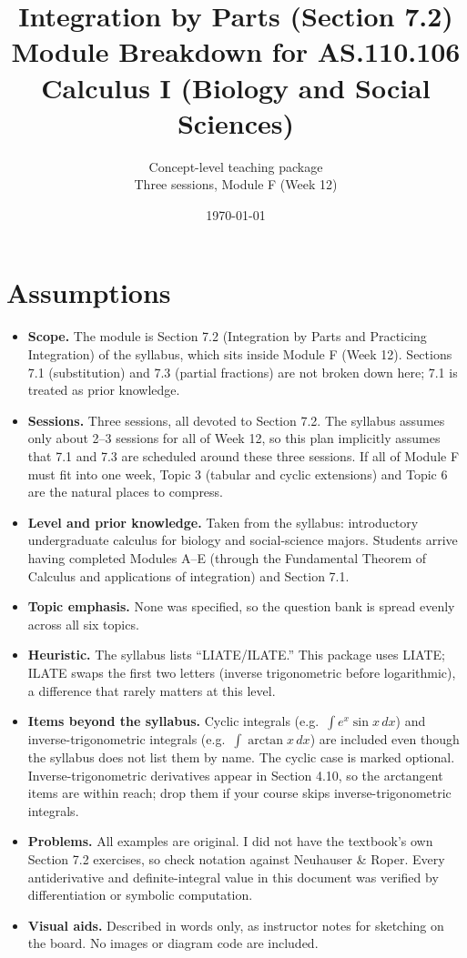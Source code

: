 \documentclass[11pt]{article}
\title{Integration by Parts (Section 7.2) \\ \large Module Breakdown for AS.110.106 Calculus I (Biology and Social Sciences)}
\author{Concept-level teaching package \\ \small Three sessions, Module F (Week 12)}
\date{\today}
\begin{document}
\maketitle
\tableofcontents

\section*{Assumptions}
\begin{itemize}
\item \textbf{Scope.} The module is Section 7.2 (Integration by Parts and Practicing Integration) of the syllabus, which sits inside Module F (Week 12). Sections 7.1 (substitution) and 7.3 (partial fractions) are not broken down here; 7.1 is treated as prior knowledge.
\item \textbf{Sessions.} Three sessions, all devoted to Section 7.2. The syllabus assumes only about 2--3 sessions for all of Week 12, so this plan implicitly assumes that 7.1 and 7.3 are scheduled around these three sessions. If all of Module F must fit into one week, Topic 3 (tabular and cyclic extensions) and Topic 6 are the natural places to compress.
\item \textbf{Level and prior knowledge.} Taken from the syllabus: introductory undergraduate calculus for biology and social-science majors. Students arrive having completed Modules A--E (through the Fundamental Theorem of Calculus and applications of integration) and Section 7.1.
\item \textbf{Topic emphasis.} None was specified, so the question bank is spread evenly across all six topics.
\item \textbf{Heuristic.} The syllabus lists ``LIATE/ILATE.'' This package uses LIATE; ILATE swaps the first two letters (inverse trigonometric before logarithmic), a difference that rarely matters at this level.
\item \textbf{Items beyond the syllabus.} Cyclic integrals (e.g.\ $\int e^x\sin x\,dx$) and inverse-trigonometric integrals (e.g.\ $\int \arctan x\,dx$) are included even though the syllabus does not list them by name. The cyclic case is marked optional. Inverse-trigonometric derivatives appear in Section 4.10, so the arctangent items are within reach; drop them if your course skips inverse-trigonometric integrals.
\item \textbf{Problems.} All examples are original. I did not have the textbook's own Section 7.2 exercises, so check notation against Neuhauser \& Roper. Every antiderivative and definite-integral value in this document was verified by differentiation or symbolic computation.
\item \textbf{Visual aids.} Described in words only, as instructor notes for sketching on the board. No images or diagram code are included.
\end{itemize}
\end{document}
